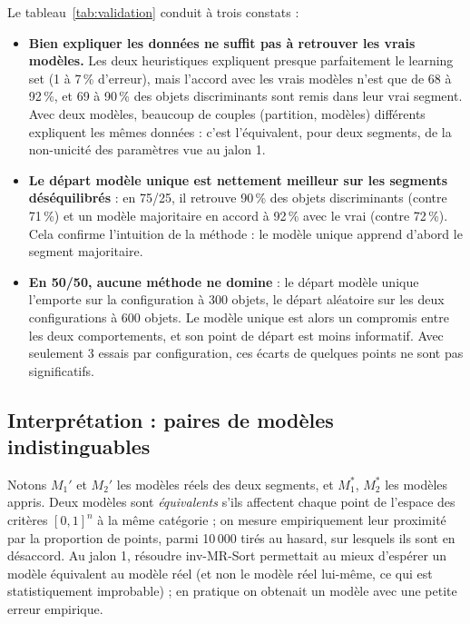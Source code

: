 \documentclass[11pt,a4paper]{article}
\begin{document}
Le tableau~\ref{tab:validation} conduit à trois constats :
\begin{itemize}
  \item \textbf{Bien expliquer les données ne suffit pas à retrouver les vrais modèles.} Les deux heuristiques
        expliquent presque parfaitement le learning set (1 à 7\,\% d'erreur), mais l'accord avec les vrais
        modèles n'est que de 68 à 92\,\%, et 69 à 90\,\% des objets discriminants sont remis dans leur vrai
        segment. Avec deux modèles, beaucoup de couples (partition, modèles) différents expliquent les mêmes
        données : c'est l'équivalent, pour deux segments, de la non-unicité des paramètres vue au jalon 1.
  \item \textbf{Le départ modèle unique est nettement meilleur sur les segments déséquilibrés} : en 75/25, il
        retrouve 90\,\% des objets discriminants (contre 71\,\%) et un modèle majoritaire en accord à 92\,\% avec
        le vrai (contre 72\,\%). Cela confirme l'intuition de la méthode : le modèle unique apprend d'abord le
        segment majoritaire.
  \item \textbf{En 50/50, aucune méthode ne domine} : le départ modèle unique l'emporte sur la configuration à
        300 objets, le départ aléatoire sur les deux configurations à 600 objets. Le modèle unique est alors un
        compromis entre les deux comportements, et son point de départ est moins informatif. Avec seulement
        3 essais par configuration, ces écarts de quelques points ne sont pas significatifs.
\end{itemize}

\subsection{Interprétation : paires de modèles indistinguables}

Notons $M_1'$ et $M_2'$ les modèles réels des deux segments, et $M_1^*$, $M_2^*$ les modèles appris. Deux
modèles sont \emph{équivalents} s'ils affectent chaque point de l'espace des critères $[0,1]^n$ à la même
catégorie ; on mesure empiriquement leur proximité par la proportion de points, parmi 10\,000 tirés au hasard,
sur lesquels ils sont en désaccord. Au jalon 1, résoudre inv-MR-Sort permettait au mieux d'espérer un modèle
équivalent au modèle réel (et non le modèle réel lui-même, ce qui est statistiquement improbable) ; en pratique
on obtenait un modèle avec une petite erreur empirique.
\end{document}
